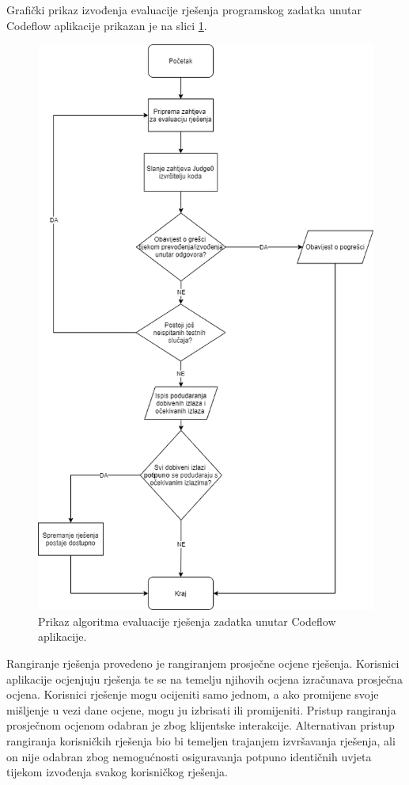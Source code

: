\documentclass[times, utf8, zavrsni, numeric]{fer}
\begin{document}
	Grafički prikaz izvođenja evaluacije rješenja programskog zadatka unutar Codeflow aplikacije prikazan je na slici \ref{fig:algorithm}.
	\begin{figure}[H]
		\centering
		\includegraphics[width=\linewidth]{pictures/prikazi/Algorithm.png}
		\caption{Prikaz algoritma evaluacije rješenja zadatka unutar Codeflow aplikacije.}
		\label{fig:algorithm}
	\end{figure}
	Rangiranje rješenja provedeno je rangiranjem prosječne ocjene rješenja. Korisnici aplikacije ocjenjuju rješenja te se na temelju njihovih ocjena izračunava prosječna ocjena. Korisnici rješenje mogu ocijeniti samo jednom, a ako promijene svoje mišljenje u vezi dane ocjene, mogu ju izbrisati ili promijeniti. Pristup rangiranja prosječnom ocjenom odabran je zbog klijentske interakcije. Alternativan pristup rangiranja korisničkih rješenja bio bi temeljen trajanjem izvršavanja rješenja, ali on nije odabran zbog nemogućnosti osiguravanja potpuno identičnih uvjeta tijekom izvođenja svakog korisničkog rješenja.
	
\end{document}

